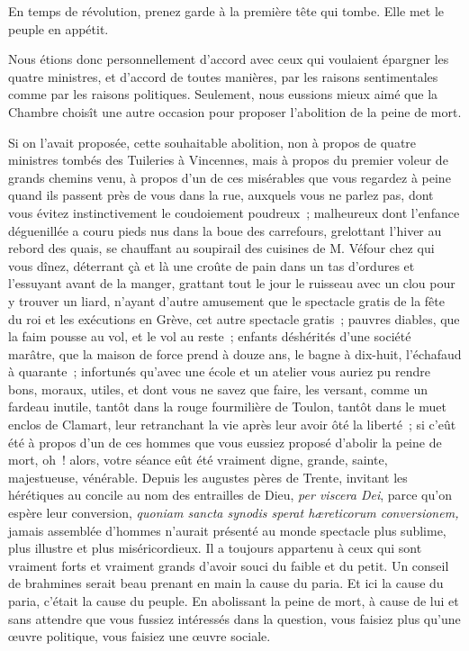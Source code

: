 \documentclass[french,twoside]{book} %
\begin{document}
En temps de révolution, prenez garde à la première tête qui tombe. Elle met le peuple en appétit.\par
Nous étions donc personnellement d’accord avec ceux qui voulaient épargner les quatre ministres, et d’accord de toutes manières, par les raisons sentimentales comme par  les raisons politiques. Seulement, nous eussions mieux aimé que la Chambre choisît une autre occasion pour proposer l’abolition de la peine de mort.\par
Si on l’avait proposée, cette souhaitable abolition, non à propos de quatre ministres tombés des Tuileries à Vincennes, mais à propos du premier voleur de grands chemins venu, à propos d’un de ces misérables que vous regardez à peine quand ils passent près de vous dans la rue, auxquels vous ne parlez pas, dont vous évitez instinctivement le coudoiement poudreux ; malheureux dont l’enfance déguenillée a couru pieds nus dans la boue des carrefours, grelottant l’hiver au rebord des quais, se chauffant au soupirail des cuisines de M. Véfour chez qui vous dînez, déterrant çà et là une croûte de pain dans un tas d’ordures et l’essuyant avant de la manger, grattant tout le jour le ruisseau avec un clou pour y trouver un liard, n’ayant d’autre amusement que le spectacle gratis de la fête du roi et les exécutions en Grève, cet autre spectacle gratis ; pauvres diables, que la faim pousse au vol, et le vol au reste ; enfants déshérités d’une société marâtre, que la maison de force prend à douze ans, le bagne à dix-huit, l’échafaud à quarante ; infortunés qu’avec une école et un atelier vous auriez pu rendre bons, moraux, utiles, et dont vous ne savez que faire, les versant, comme un fardeau inutile, tantôt dans la rouge fourmilière de Toulon, tantôt dans le muet enclos de Clamart, leur retranchant la vie après leur avoir ôté la liberté ; si c’eût été à propos d’un de ces hommes que vous eussiez proposé d’abolir la peine de mort, oh ! alors, votre séance eût été vraiment digne, grande, sainte, majestueuse, vénérable. Depuis les augustes pères de Trente, invitant les  hérétiques au concile au nom des entrailles de Dieu, \emph{per viscera Dei}, parce qu’on espère leur conversion, \emph{quoniam sancta synodis sperat hæreticorum conversionem,} jamais assemblée d’hommes n’aurait présenté au monde spectacle plus sublime, plus illustre et plus miséricordieux. Il a toujours appartenu à ceux qui sont vraiment forts et vraiment grands d’avoir souci du faible et du petit. Un conseil de brahmines serait beau prenant en main la cause du paria. Et ici la cause du paria, c’était la cause du peuple. En abolissant la peine de mort, à cause de lui et sans attendre que vous fussiez intéressés dans la question, vous faisiez plus qu’une œuvre politique, vous faisiez une œuvre sociale.\par
\end{document}
